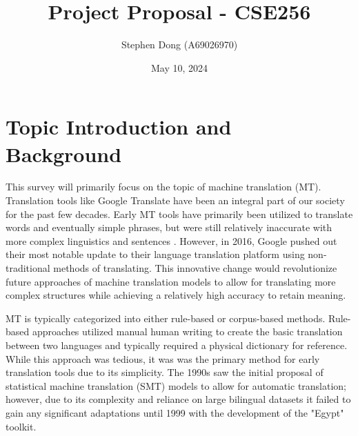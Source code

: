 \documentclass{article}
\title{Project Proposal - CSE256}
\author{Stephen Dong (A69026970)}
\date{May 10, 2024}
\begin{document}
\maketitle

\section{Topic Introduction and Background}

This survey will primarily focus on the topic of machine translation (MT). Translation tools like Google Translate have been an integral part of our society for the past few decades. 
Early MT tools have primarily been utilized to translate words and eventually simple phrases, but were still relatively inaccurate with more complex linguistics and sentences \cite{WANG2022143}. 
However, in 2016, Google pushed out their most notable update to their language translation platform using non-traditional methods of translating. This innovative change would revolutionize future approaches of machine translation models to allow for translating more complex structures while achieving a relatively high accuracy to retain meaning.

MT is typically categorized into either rule-based or corpus-based methods. Rule-based approaches utilized manual human writing to create the basic translation between two languages and typically required a physical dictionary for reference. While this approach was tedious, it was was the primary method for early translation tools due to its simplicity. The 1990s saw the initial proposal of statistical machine translation (SMT) models to allow for automatic translation; however, due to its complexity and reliance on large bilingual datasets it failed to gain any significant adaptations until 1999 with the development of the "Egypt" toolkit. \cite{WANG2022143}
\end{document}
